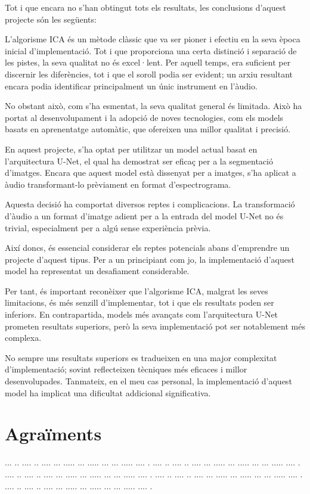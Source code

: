 \documentclass[10pt,a4paper,twocolumn,twoside]{article}
\begin{document}
Tot i que encara no s'han obtingut tots els resultats, les conclusions d'aquest projecte són les següents:

L'algorisme ICA és un mètode clàssic que va ser pioner i efectiu en la seva època inicial d'implementació. Tot i que proporciona una certa distinció i separació de les pistes, la seva qualitat no és excel·lent. Per aquell temps, era suficient per discernir les diferències, tot i que el soroll podia ser evident; un arxiu resultant encara podia identificar principalment un únic instrument en l'àudio.

No obstant això, com s'ha esmentat, la seva qualitat general és limitada. Això ha portat al desenvolupament i la adopció de noves tecnologies, com els models basats en aprenentatge automàtic, que ofereixen una millor qualitat i precisió.

En aquest projecte, s'ha optat per utilitzar un model actual basat en l'arquitectura U-Net, el qual ha demostrat ser eficaç per a la segmentació d'imatges. Encara que aquest model està dissenyat per a imatges, s'ha aplicat a àudio transformant-lo prèviament en format d'espectrograma.

Aquesta decisió ha comportat diversos reptes i complicacions. La transformació d'àudio a un format d'imatge adient per a la entrada del model U-Net no és trivial, especialment per a algú sense experiència prèvia.

Així doncs, és essencial considerar els reptes potencials abans d'emprendre un projecte d'aquest tipus. Per a un principiant com jo, la implementació d'aquest model ha representat un desafiament considerable.

Per tant, és important reconèixer que l'algorisme ICA, malgrat les seves limitacions, és més senzill d'implementar, tot i que els resultats poden ser inferiors. En contrapartida, models més avançats com l'arquitectura U-Net prometen resultats superiors, però la seva implementació pot ser notablement més complexa.

No sempre uns resultats superiors es tradueixen en una major complexitat d'implementació; sovint reflecteixen tècniques més eficaces i millor desenvolupades. Tanmateix, en el meu cas personal, la implementació d'aquest model ha implicat una dificultat addicional significativa.


\section*{Agraïments}

... ..  .... .. .... ... ..... ... ..... ... ... ..... .... .
.... ..  .... .. .... ... ..... ... ..... ... ... ..... .... .
.... ..  .... .. .... ... ..... ... ..... ... ... ..... .... .
.... ..  .... .. .... ... ..... ... ..... ... ... ..... .... .
.... ..  .... .. .... ... ..... ... ..... ... ... ..... .... .
\end{document}
